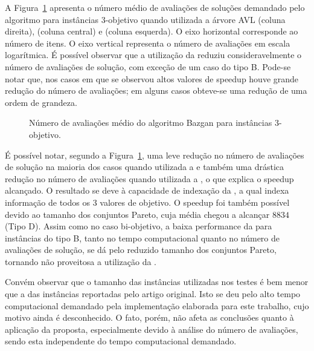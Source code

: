 A Figura~\ref{fig:cmp3dim} apresenta o número médio de avaliações de soluções
demandado pelo algoritmo para instâncias 3-objetivo quando
utilizada a árvore AVL (coluna direita),  (coluna central)
e  (coluna esquerda).
O eixo horizontal corresponde ao número de itens.
O eixo vertical representa o número de avaliações em escala logarítmica.
É possível observar que a utilização da  reduziu consideravelmente o
número de avaliações de solução, com exceção de um caso do tipo B.
Pode-se notar que, nos casos em que se observou altos valores de speedup
houve grande redução do número de avaliações; em alguns casos obteve-se
uma redução de uma ordem de grandeza.

\begin{figure}[]
  \centering
  
  \caption{Número de avaliações médio do algoritmo Bazgan para instâncias 3-objetivo.}
  \label{fig:cmp3dim}
\end{figure}

É possível notar, segundo a Figura~\ref{fig:cmp3dim}, uma
leve redução no número de avaliações de solução na maioria dos casos quando
utilizada a  e também uma drástica redução no número de avaliações
quando utilizada a , o que explica o speedup alcançado.
O resultado se deve à capacidade de indexação da , a qual
indexa informação de todos os 3 valores de objetivo.
O speedup foi também possível devido ao tamanho dos conjuntos Pareto,
cuja média chegou a alcançar $8834$ (Tipo D).
Assim como no caso bi-objetivo, a baixa performance da \kdtree{} para
instâncias do tipo B, tanto no tempo computacional quanto no número de avaliações de solução,
se dá pelo reduzido tamanho dos conjuntos Pareto, tornando não proveitosa
a utilização da \kdtree{}.

Convém observar que o tamanho das instâncias utilizadas nos testes
é bem menor que a das instâncias reportadas pelo artigo original.
Isto se deu pelo alto tempo computacional demandado pela implementação
elaborada para este trabalho, cujo motivo ainda é desconhecido.
O fato, porém, não afeta as conclusões quanto à aplicação da proposta,
especialmente devido à análise do número de avaliações, sendo esta independente
do tempo computacional demandado.


